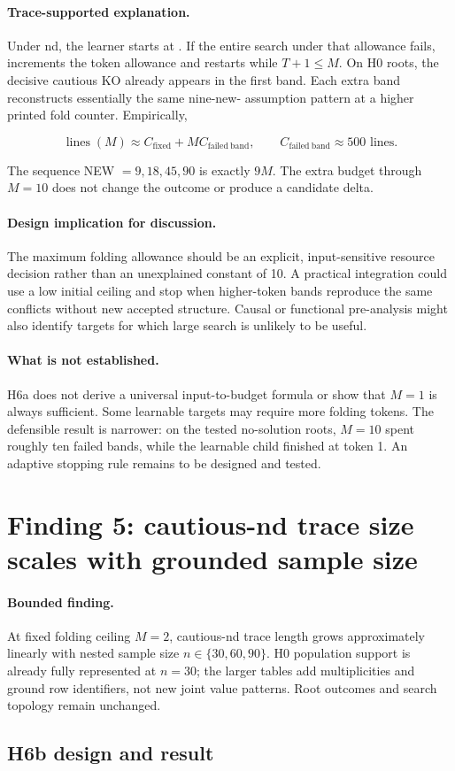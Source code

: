 \documentclass[11pt]{article}
\DeclareRobustCommand{\code}[1]{\texttt{\detokenize{#1}}}
\newcommand{\finding}{\paragraph{Bounded finding.}}
\newcommand{\explanation}{\paragraph{Trace-supported explanation.}}
\newcommand{\implication}{\paragraph{Design implication for discussion.}}
\newcommand{\boundary}{\paragraph{What is not established.}}
\begin{document}
\explanation
Under nd, the learner starts at \code{tokens(1)}. If the entire search under
that allowance fails, \code{genT} increments the token allowance and restarts
while \(T+1\leq M\). On H0 roots, the decisive cautious KO already appears in
the first band. Each extra band reconstructs essentially the same nine-new-
assumption pattern at a higher printed fold counter. Empirically,

\[
  \operatorname{lines}(M)\approx C_{\mathrm{fixed}}+M C_{\mathrm{failed\ band}},
  \qquad C_{\mathrm{failed\ band}}\approx 500\text{ lines}.
\]

The sequence NEW \(=9,18,45,90\) is exactly \(9M\). The extra budget through
\(M=10\) does not change the outcome or produce a candidate delta.

\implication
The maximum folding allowance should be an explicit, input-sensitive resource
decision rather than an unexplained constant of 10. A practical integration
could use a low initial ceiling and stop when higher-token bands reproduce the
same conflicts without new accepted structure. Causal or functional
pre-analysis might also identify targets for which large search is unlikely to
be useful.

\boundary
H6a does not derive a universal input-to-budget formula or show that \(M=1\)
is always sufficient. Some learnable targets may require more folding tokens.
The defensible result is narrower: on the tested no-solution roots, \(M=10\)
spent roughly ten failed bands, while the learnable child finished at token 1.
An adaptive stopping rule remains to be designed and tested.

\section{Finding 5: cautious-nd trace size scales with grounded sample size}

\finding
At fixed folding ceiling \(M=2\), cautious-nd trace length grows approximately
linearly with nested sample size \(n\in\{30,60,90\}\). H0 population support is
already fully represented at \(n=30\); the larger tables add multiplicities and
ground row identifiers, not new joint value patterns. Root outcomes and search
topology remain unchanged.

\subsection{H6b design and result}
\end{document}
